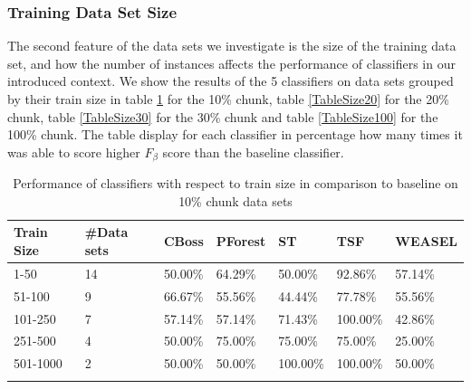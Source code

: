 

\subsubsection{Training Data Set Size}
The second feature of the data sets we investigate is the size of the training data set, and how the number of instances affects the performance of classifiers in our introduced context.
We show the results of the 5 classifiers on data sets grouped by their train size in table \ref{TableSize10} for the 10\% chunk, table \ref{TableSize20} for the 20\% chunk, table \ref{TableSize30} for the 30\% chunk and table \ref{TableSize100} for the 100\% chunk.
The table display for each classifier in percentage how many times it was able to score higher $F_{\beta}$ score than the baseline classifier.

\begin{table}[hp!]
	\setlength\extrarowheight{2pt} %
	\begin{tabularx}{\textwidth}{|X|X|X|X|X|X|X|}
	\hline
	\textbf{Train Size} & \textbf{\#Data sets} & \textbf{CBoss} & \textbf{PForest} & \textbf{ST} & \textbf{TSF} & \textbf{WEASEL} \\ \hline
		1-50 & 14 & 50.00\% & 64.29\% & 50.00\% & 92.86\% & 57.14\% \\ \hline
		51-100 & 9 & 66.67\% & 55.56\% & 44.44\% & 77.78\% & 55.56\% \\ \hline
		101-250 & 7 & 57.14\% & 57.14\% & 71.43\% & 100.00\% & 42.86\% \\ \hline
		251-500 & 4 & 50.00\% & 75.00\% & 75.00\% & 75.00\% & 25.00\% \\ \hline
		501-1000 & 2 &50.00\% & 50.00\% & 100.00\% & 100.00\% & 50.00\% \\ \hline
	\caption{Performance of classifiers with respect to train size in comparison to baseline on 10\% chunk data sets}
	\label{TableSize10}
  \end{tabularx}
\end{table}

